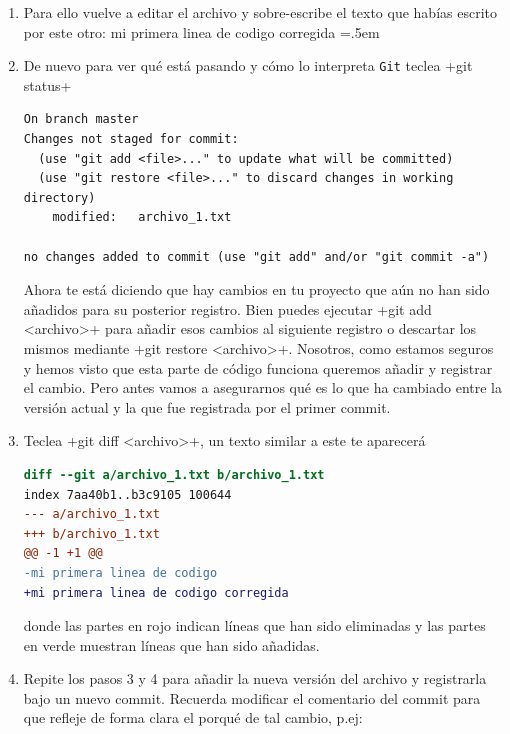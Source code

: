 \documentclass[a5paper, oneside,10pt]{article}
\newenvironment{cverbatim}
 {\SaveVerbatim{cverb}}
 {\endSaveVerbatim
  \flushleft\fboxrule=0pt\fboxsep=.5em
  \colorbox{bg}{\BUseVerbatim{cverb}}%
  \endflushleft
}
\begin{document}
    \begin{enumerate}
    \item Para ello vuelve a editar el archivo y sobre-escribe el texto que habías escrito por este otro:
    \begin{cverbatim}
mi primera linea de codigo corregida
    \end{cverbatim}
      
    \item De nuevo para ver qué está pasando y cómo lo interpreta \verb+Git+ teclea \cverb+git status+
    
    \begin{lstlisting}[style=custom]
On branch master
Changes not staged for commit:
  (use "git add <file>..." to update what will be committed)
  (use "git restore <file>..." to discard changes in working directory)
	modified:   archivo_1.txt

no changes added to commit (use "git add" and/or "git commit -a")
    \end{lstlisting}
    
    Ahora te está diciendo que hay cambios en tu proyecto que aún no han sido añadidos para su posterior registro. Bien puedes ejecutar \cverb+git add <archivo>+ para añadir esos cambios al siguiente registro o descartar los mismos mediante \cverb+git restore <archivo>+. Nosotros, como estamos seguros y hemos visto que esta parte de código funciona queremos añadir y registrar el cambio. Pero antes vamos a asegurarnos qué es lo que ha cambiado entre la versión actual y la que fue registrada por el primer commit. 
    
    \item Teclea \cverb+git diff <archivo>+, un texto similar a este te aparecerá
    
    \begin{lstlisting}[style=custom, language=diff]
diff --git a/archivo_1.txt b/archivo_1.txt
index 7aa40b1..b3c9105 100644
--- a/archivo_1.txt
+++ b/archivo_1.txt
@@ -1 +1 @@
-mi primera linea de codigo
+mi primera linea de codigo corregida
    \end{lstlisting}
    donde las partes en rojo indican líneas que han sido eliminadas y las partes en verde muestran líneas que han sido añadidas.
    
    \item Repite los pasos 3 y 4 para añadir la nueva versión del archivo y registrarla bajo un nuevo commit. Recuerda modificar el comentario del commit para que refleje de forma clara el porqué de tal cambio, p.ej: 
    

\end{enumerate}
\end{document}
